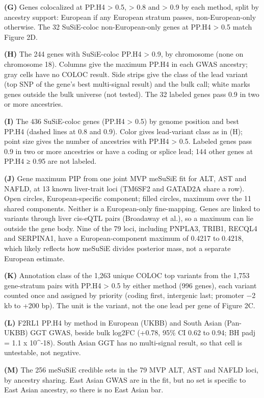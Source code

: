 \textbf{(G)} Genes colocalized at PP.H4 \textgreater{} 0.5, \textgreater{} 0.8 and \textgreater{} 0.9 by each method, split by ancestry support: European if any European stratum passes, non-European-only otherwise. The 32 SuSiE-coloc non-European-only genes at PP.H4 \textgreater{} 0.5 match Figure 2D.

\textbf{(H)} The 244 genes with SuSiE-coloc PP.H4 \textgreater{} 0.9, by chromosome (none on chromosome 18). Columns give the maximum PP.H4 in each GWAS ancestry; gray cells have no COLOC result. Side strips give the class of the lead variant (top SNP of the gene's best multi-signal result) and the bulk call; white marks genes outside the bulk universe (not tested). The 32 labeled genes pass 0.9 in two or more ancestries.

\textbf{(I)} The 436 SuSiE-coloc genes (PP.H4 \textgreater{} 0.5) by genome position and best PP.H4 (dashed lines at 0.8 and 0.9). Color gives lead-variant class as in (H); point size gives the number of ancestries with PP.H4 \textgreater{} 0.5. Labeled genes pass 0.9 in two or more ancestries or have a coding or splice lead; 144 other genes at PP.H4 ≥ 0.95 are not labeled.

\textbf{(J)} Gene maximum PIP from one joint MVP meSuSiE fit for ALT, AST and NAFLD, at 13 known liver-trait loci (TM6SF2 and GATAD2A share a row). Open circles, European-specific component; filled circles, maximum over the 11 shared components. Neither is a European-only fine-mapping. Genes are linked to variants through liver cis-eQTL pairs (Broadaway et al.), so a maximum can lie outside the gene body. Nine of the 79 loci, including PNPLA3, TRIB1, RECQL4 and SERPINA1, have a European-component maximum of 0.4217 to 0.4218, which likely reflects how meSuSiE divides posterior mass, not a separate European estimate.

\textbf{(K)} Annotation class of the 1,263 unique COLOC top variants from the 1,753 gene-stratum pairs with PP.H4 \textgreater{} 0.5 by either method (996 genes), each variant counted once and assigned by priority (coding first, intergenic last; promoter −2 kb to +200 bp). The unit is the variant, not the one lead per gene of Figure 2C.

\textbf{(L)} F2RL1 PP.H4 by method in European (UKBB) and South Asian (Pan-UKBB) GGT GWAS, beside bulk log2FC (+0.78, 95\% CI 0.62 to 0.94; BH padj = 1.1 x 10\^{}-18). South Asian GGT has no multi-signal result, so that cell is untestable, not negative.

\textbf{(M)} The 256 meSuSiE credible sets in the 79 MVP ALT, AST and NAFLD loci, by ancestry sharing. East Asian GWAS are in the fit, but no set is specific to East Asian ancestry, so there is no East Asian bar.

